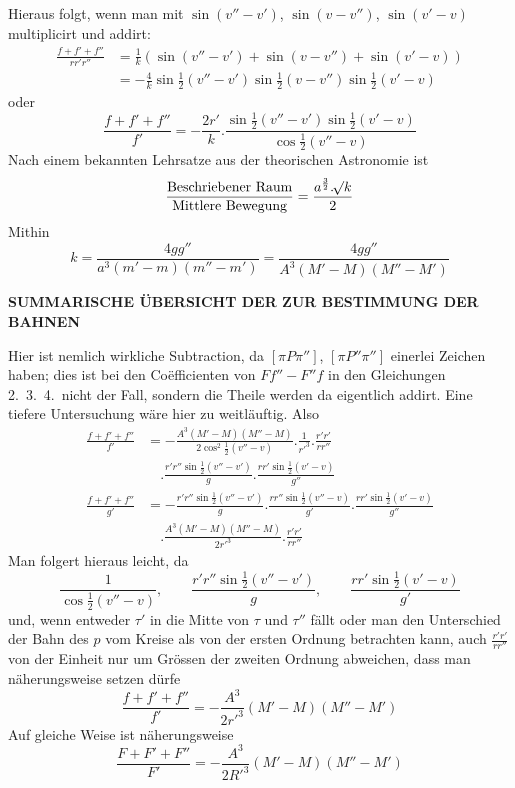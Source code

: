 Hieraus folgt, wenn man mit $\sin(v''-v')$, $\sin(v-v'')$, $\sin(v'-v)$ multiplicirt und addirt:
\[
\begin{aligned}
\frac{f+f'+f''}{rr'r''}&=\frac1k(\sin(v''-v')+\sin(v-v'')+\sin(v'-v))\\
&=-\frac4k\sin\tfrac12(v''-v')\sin\tfrac12(v-v'')\sin\tfrac12(v'-v)
\end{aligned}
\]
oder
\[
\frac{f+f'+f''}{f'}=-\frac{2r'}k.\frac{\sin\tfrac12(v''-v')\sin\tfrac12(v'-v)}{\cos\tfrac12(v''-v)}
\]
Nach einem bekannten Lehrsatze aus der theorischen Astronomie ist
\[
\frac{\text{Beschriebener Raum}}{\text{Mittlere Bewegung}}=\frac{a^{\frac32}.\mathord{{}^{}\!\surd}k}2
\]
Mithin
\[
k=\frac{4gg''}{a^3(m'-m)(m''-m')}=\frac{4gg''}{A^3(M'-M)(M''-M')}
\]
\clearpage
\thispagestyle{empty}
\noindent{}%
%
\parbox[t]{\dimexpr\linewidth-24mm\relax}{\centering\fontsize{7.4}{9.2}\selectfont\bfseries SUMMARISCHE ÜBERSICHT DER ZUR BESTIMMUNG DER BAHNEN\par}%
\makebox[12mm][r]{}\par\nobreak\smallskip
\begingroup\fontsize{10.65}{12}\selectfont
\abovedisplayskip=6pt\belowdisplayskip=6pt
\abovedisplayshortskip=3pt\belowdisplayshortskip=4pt
\expandafter\def\csname HistoricalNoteText11\endcsname{Hier ist nemlich wirkliche Subtraction, da $[\pi P\pi'']$, $[\pi P''\pi'']$ einerlei Zeichen haben; dies ist bei den Coëfficienten von $Ff''-F''f$ in den Gleichungen 2.\ 3.\ 4.\ nicht der Fall, sondern die Theile werden da eigentlich addirt. Eine tiefere Untersuchung wäre hier zu weitläuftig.}%
\noindent Also
\[
\begin{aligned}
\frac{f+f'+f''}{f'}&=-\frac{A^3(M'-M)(M''-M)}{2\cos^2\tfrac12(v''-v)}.\frac1{r'^3}.\frac{r'r'}{rr''}\\&\quad.\frac{r'r''\sin\tfrac12(v''-v')}{g}.\frac{rr'\sin\tfrac12(v'-v)}{g''}\\
\frac{f+f'+f''}{g'}&=-\frac{r'r''\sin\tfrac12(v''-v')}{g}.\frac{rr''\sin\tfrac12(v''-v)}{g'}.\frac{rr'\sin\tfrac12(v'-v)}{g''}\\&\quad.\frac{A^3(M'-M)(M''-M)}{2r'^3}.\frac{r'r'}{rr''}
\end{aligned}
\]
Man folgert hieraus leicht, da
\[
\frac1{\cos\tfrac12(v''-v)},\qquad\frac{r'r''\sin\tfrac12(v''-v')}{g},\qquad\frac{rr'\sin\tfrac12(v'-v)}{g'}
\]
und, wenn entweder $\tau'$ in die Mitte von $\tau$ und $\tau''$ fällt oder man den Unterschied der Bahn des $p$ vom Kreise als von der ersten Ordnung betrachten kann, auch $\frac{r'r'}{rr''}$ von der Einheit nur um Grössen der zweiten Ordnung abweichen, dass man näherungsweise setzen dürfe
\[
\frac{f+f'+f''}{f'}=-\frac{A^3}{2r'^3}(M'-M)(M''-M')
\]
Auf gleiche Weise ist näherungsweise
\[
\frac{F+F'+F''}{F'}=-\frac{A^3}{2R'^3}(M'-M)(M''-M')
\]

